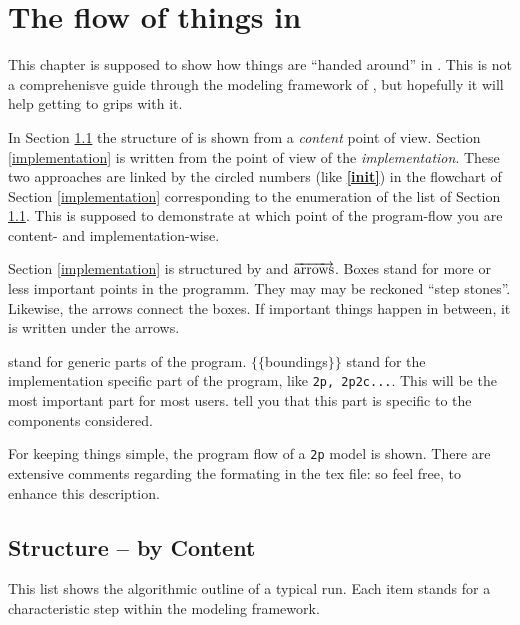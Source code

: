 \section{The flow of things in \Dumux}
\label{flow}


This chapter is supposed to show how things are ``handed around'' in \Dumux. This
is not a comprehenisve guide through the modeling framework of \Dumux, but
hopefully it will help getting to grips with it.

In Section \ref{content} the structure of \Dumux is shown from a \emph{content}
point of view.
Section \ref{implementation} is written from the point of view of the \emph{implementation}.
These two approaches are linked by the circled numbers (like \textbf{\textcircled{\ref{init}}})
in the flowchart of Section \ref{implementation} corresponding to the enumeration
of the list of Section \ref{content}. This is supposed to demonstrate at which point
of the program-flow you are content- and implementation-wise.

Section \ref{implementation} is structured by  and
$\overrightarrow{\textnormal{arrows}}$. Boxes stand for more or less important
points in the programm. They may may be reckoned ``step stones''. Likewise, the
arrows connect the boxes. If important things happen in between, it is written
under the arrows.

 stand for generic parts of the program. 
$\lbrace\lbrace$boundings$\rbrace\rbrace$ stand for the implementation specific
part of the program, like \verb+2p, 2p2c...+. This will be the most important
part for most users.  tell you that this part is specific
to the components considered.

For keeping things simple, the program flow of a \verb+2p+ model is shown.
There are extensive comments regarding the formating in the tex file: so feel free,
to enhance this description.

\subsection{Structure -- by Content}
\label{content}
This list shows the algorithmic outline of a typical \Dumux run. Each item stands
for a characteristic step within the modeling framework.

